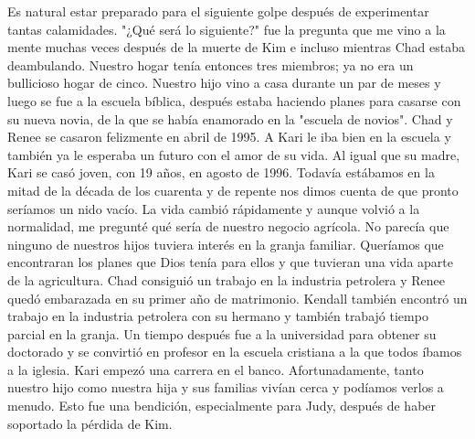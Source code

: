 \documentclass[twoside, 12pt]{book}
\begin{document}
Es natural estar preparado para el siguiente golpe después de experimentar tantas calamidades. "¿Qué será lo siguiente?" fue la pregunta que me vino a la mente muchas veces después de la muerte de Kim e incluso mientras Chad estaba deambulando. Nuestro hogar tenía entonces tres miembros; ya no era un bullicioso hogar de cinco. Nuestro hijo vino a casa durante un par de meses y luego se fue a la escuela bíblica, después estaba haciendo planes para casarse con su nueva novia, de la que se había enamorado en la "escuela de novios". Chad y Renee se casaron felizmente en abril de 1995. A Kari le iba bien en la escuela y también ya le esperaba un futuro con el amor de su vida. Al igual que su madre, Kari se casó joven, con 19 años, en agosto de 1996. Todavía estábamos en la mitad de la década de los cuarenta y de repente nos dimos cuenta de que pronto seríamos un nido vacío. La vida cambió rápidamente y aunque volvió a la normalidad, me pregunté qué sería de nuestro negocio agrícola. No parecía que ninguno de nuestros hijos tuviera interés en la granja familiar. Queríamos que encontraran los planes que Dios tenía para ellos y que tuvieran una vida aparte de la agricultura. Chad consiguió un trabajo en la industria petrolera y Renee quedó embarazada en su primer año de matrimonio. Kendall también encontró un trabajo en la industria petrolera con su hermano y también trabajó tiempo parcial en la granja. Un tiempo después fue a la universidad para obtener su doctorado y se convirtió en profesor en la escuela cristiana a la que todos íbamos a la iglesia. Kari empezó una carrera en el banco. Afortunadamente, tanto nuestro hijo como nuestra hija y sus familias vivían cerca y podíamos verlos a menudo. Esto fue una bendición, especialmente para Judy, después de haber soportado la pérdida de Kim.\\
\end{document}

